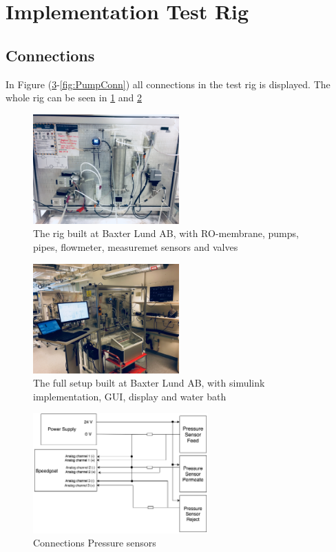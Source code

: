 \newpage

\section{Implementation Test Rig}


\subsection{Connections}
In Figure (\ref{fig:PressConn}-\ref{fig:PumpConn}) all connections in the test rig is displayed. The whole rig can be seen in \ref{fig:Rig1} and \ref{fig:Rig2}

\begin{figure}[h]
    \centering
    \includegraphics[width=0.5\textwidth]{Rig1}
    \caption{The rig built at Baxter Lund AB, with RO-membrane, pumps, pipes, flowmeter, measuremet sensors and valves}
    \label{fig:Rig1}
\end{figure}

\begin{figure}[h]
    \centering
    \includegraphics[width=0.5\textwidth]{Rig2}
    \caption{The full setup built at Baxter Lund AB, with simulink implementation, GUI, display and water bath}
    \label{fig:Rig2}
\end{figure}


\begin{figure}[h]
    \centering
    \includegraphics[width=0.6\textwidth]{PressConn}
    \caption{Connections Pressure sensors}
    \label{fig:PressConn}
\end{figure}

